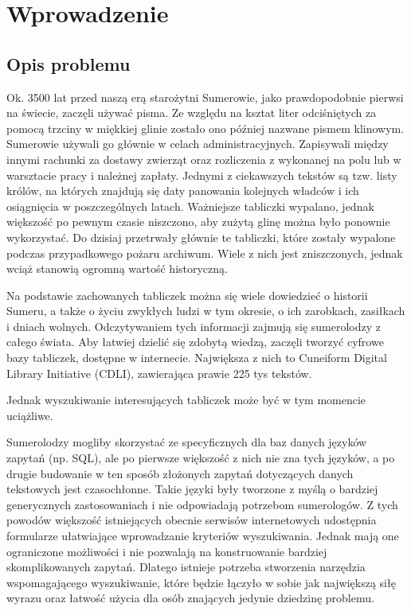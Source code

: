 \chapter*{Wprowadzenie}

 

\section*{Opis problemu}
Ok. 3500 lat przed naszą erą starożytni Sumerowie, jako prawdopodobnie pierwsi na świecie, zaczęli używać pisma. 
Ze względu na ksztat liter odciśniętych za pomocą trzciny w miękkiej glinie zostało ono później nazwane pismem klinowym. 
Sumerowie używali go głównie w celach administracyjnych. Zapisywali między innymi rachunki za dostawy zwierząt oraz rozliczenia z 
wykonanej na polu lub w warsztacie pracy i należnej zapłaty. Jednymi z ciekawszych tekstów są tzw. listy królów, na 
których znajdują się daty panowania kolejnych władców i ich osiągnięcia w poszczególnych latach. 
Ważniejsze tabliczki wypalano, jednak większość po pewnym czasie niszczono, aby zużytą glinę można było ponownie wykorzystać. 
Do dzisiaj przetrwały głównie te tabliczki, które zostały wypalone podczas przypadkowego pożaru archiwum. 
Wiele z nich jest zniszczonych, jednak wciąż stanowią ogromną wartość historyczną. 
 
Na podstawie zachowanych tabliczek można się wiele dowiedzieć o historii Sumeru, a także o życiu zwykłych ludzi w tym okresie, 
o ich zarobkach, zasiłkach i dniach wolnych. Odczytywaniem tych informacji zajmują się sumerolodzy z całego świata. 
Aby łatwiej dzielić się zdobytą wiedzą, zaczęli tworzyć cyfrowe bazy tabliczek, dostępne w internecie. 
Największa z nich to Cuneiform Digital Library Initiative (CDLI), zawierająca prawie 225 tys tekstów.

Jednak wyszukiwanie interesujących tabliczek może być w tym momencie uciążliwe. 

Sumerolodzy mogliby skorzystać ze specyficznych dla baz danych języków zapytań (np. SQL), ale po pierwsze większość z 
nich nie zna tych języków, a po drugie budowanie w ten sposób złożonych zapytań dotyczących danych tekstowych jest czasochłonne. 
Takie języki były tworzone z myślą o bardziej generycznych zastosowaniach i nie odpowiadają potrzebom sumerologów.
Z tych powodów większość istniejących obecnie serwisów internetowych udostępnia formularze ułatwiające wprowadzanie kryteriów
 wyszukiwania. Jednak mają one ograniczone możliwości i nie pozwalają na konstruowanie bardziej skomplikowanych zapytań.
Dlatego istnieje potrzeba stworzenia narzędzia wspomagającego wyszukiwanie, które będzie łączyło w sobie jak największą siłę 
wyrazu oraz łatwość użycia dla osób znających jedynie dziedzinę problemu.

